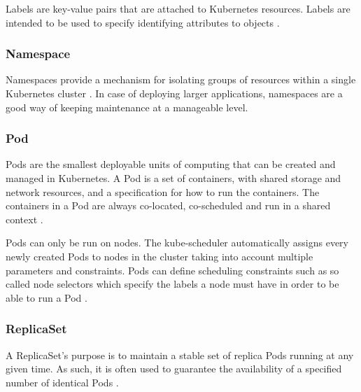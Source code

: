 Labels are key-value pairs that are attached to Kubernetes resources. Labels are intended to be used to specify identifying attributes to objects \cite{KubernetesLabel}.

\subsubsection{Namespace}

Namespaces provide a mechanism for isolating groups of resources within a single Kubernetes cluster \cite{KubernetesNamespace}. In case of deploying larger applications, namespaces are a good way of keeping maintenance at a manageable level.

\subsubsection{Pod} \label{k8s-pod}

Pods are the smallest deployable units of computing that can be created and managed in Kubernetes. A Pod is a set of containers, with shared storage and network resources, and a specification for how to run the containers. The containers in a Pod are always co-located, co-scheduled and run in a shared context \cite{KubernetesPod}.

Pods can only be run on nodes. The kube-scheduler automatically assigns every newly created Pods to nodes in the cluster taking into account multiple parameters and constraints. Pods can define scheduling constraints such as so called node selectors which specify the labels a node must have in order to be able to run a Pod \cite{KubernetesNodeSelector}.

\subsubsection{ReplicaSet}

A ReplicaSet's purpose is to maintain a stable set of replica Pods running at any given time. As such, it is often used to guarantee the availability of a specified number of identical Pods \cite{KubernetesReplicaSet}.

